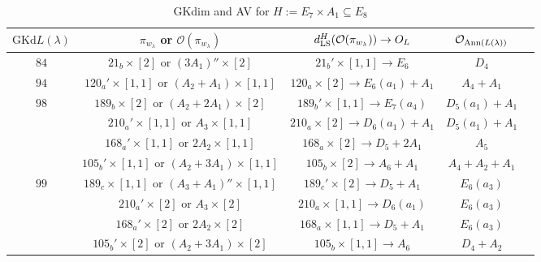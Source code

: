 \documentclass[reqno,12pt]{amsart}
\numberwithin{equation}{section}
\theoremstyle{plain}
\theoremstyle{definition}
\newcommand{\lam}{\lambda}
\renewcommand{\subset}{\subseteq}
\begin{document}
\begin{table}[htbp]\caption{ GKdim and AV for $H:=E_7\times A_1\subset E_8$} 
	\label{tabe7a1}
	\centering
	\renewcommand{\arraystretch}{1.5}
	\setlength\tabcolsep{5pt}
	
 \small  \begin{tabular}{|c|c|c|c|c|}
		\hline $\mathrm{GKd} L(\lambda)$ & ${\pi_{w_{\lam}}}$ or    $\mathcal{O}({\pi_{w_{\lam}}})$& $d_{\rm LS}^{H}(\mathcal{O}(\pi_{w_\lambda}))\rightarrow  O_{L}$ & $\mathcal{O}_{{\rm Ann}(L(\lambda))}$ \\ \hline
	$ 84 $    &  $21_b\times [2] $ or $(3A_1)''\times [2] $ &  $ 21_{b}'\times [1,1] \rightarrow E_6 $     &   $ D_4$      \\ \hline	
   
   
   $ 94$    &  $ 120_a'\times [1,1]$  or $(A_2+A_1)\times [1,1]$&   $120_a\times [2] \rightarrow E_6(a_1)+A_1$     &   $ A_4+A_1$      \\ 
   \hline

$ 98$    &  $ 189_b\times [2]$  or $(A_2+2A_1)\times [2]$&     $189_{b}'\times [1,1] \rightarrow E_7(a_4)$     &   $ D_5(a_1)+A_1$      \\
&  $ 210_a'\times [1,1]$  or $A_3\times [1,1]$&   $210_a\times [2] \rightarrow D_6(a_1)+A_1$     &   $ D_5(a_1)+A_1$      \\ 
   &  $ 168_a'\times [1,1]$  or $2A_2\times [1,1]$&   $168_a\times [2] \rightarrow D_5+2A_1$     &   $ A_5$      \\
   &  $ 105_b'\times [1,1]$  or $(A_2+3A_1)\times [1,1]$&    $105_b\times [2] \rightarrow A_6+A_1$     &   $ A_4+A_2+A_1$      \\
  \hline

$ 99$    &  $ 189_c\times [1,1]$  or $(A_3+A_1)''\times [1,1]$&     $189_c'\times [2] \rightarrow D_5+A_1$     &   $ E_6(a_3)$      \\
&  $ 210_a'\times [2]$  or $A_3\times [2]$&   $210_a\times [1,1] \rightarrow D_6(a_1)$     &   $ E_6(a_3)$      \\ 
   &  $ 168_a'\times [2]$  or $2A_2\times [2]$&   $168_a\times [1,1] \rightarrow D_5+A_1$     &   $ E_6(a_3)$      \\
   &  $ 105_b'\times [2]$  or $(A_2+3A_1)\times [2]$&    $105_b\times [1,1] \rightarrow A_6$     &   $ D_4+A_2$      \\
  \hline


\end{tabular}
\end{table}
\end{document}
